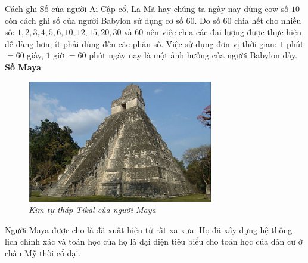\begin{multicols}{2}
	Cách ghi Số của người Ai Cập cổ, La Mã hay chúng ta ngày nay dùng cow số $10$ còn cách ghi số của người Babylon sử dụng cơ số $60$. Do số $60$ chia hết cho nhiều số: $1,2,3,4,5,6, 10, 12, 15, 20,30$ và $60$ nên việc chia các đại lượng được thực hiện dễ dàng hơn, ít phải dùng đến các phân số. Việc sử dụng đơn vị thời gian: $1$ phút $= 60$ giây, $1$ giờ $= 60$ phút ngày nay là một ảnh hưởng của người Babylon đấy.
	\vskip 0.1cm
	\textbf{Số Maya}
	\vskip 0.1cm
	\begin{figure}[H]
		\centering
		\vspace*{-10pt}
		\captionsetup{labelformat= empty, justification=centering}
		\includegraphics[width=1\linewidth]{28}
		\caption{\textit{\color{toancuabi}Kim tự tháp Tikal của người Maya}}
		\vspace*{-15pt}
	\end{figure}
	Người Maya  được cho là đã xuất hiện từ rất xa xưa. Họ đã xây dựng hệ thống lịch chính xác và toán học của họ là đại diện tiêu biểu cho toán học của dân cư ở châu Mỹ thời cổ đại.
	

\end{multicols}
